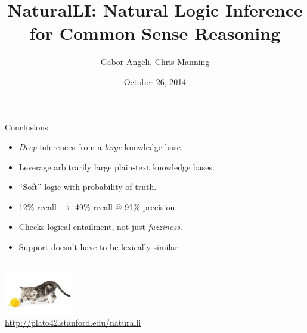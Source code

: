 \documentclass[hyperref]{beamer}
\title{NaturalLI: Natural Logic Inference for Common Sense Reasoning}
\subtitle{}
\author{Gabor Angeli, Chris Manning}
\date{October 26, 2014}
\institute[Stanford]{Stanford University}
\begin{document}
\begin{frame}[noframenumbering]
  \titlepage
\end{frame}




%



\begin{frame}{Conclusions}
\begin{itemize}
  \item \textit{Deep} inferences from a \textit{large} knowledge base.
  \item Leverage arbitrarily large plain-text knowledge bases.
  \item ``Soft'' logic with probability of truth.
\end{itemize}
\vspace{0.5cm}
\pause

\begin{itemize}
  \item 12\% recall $\rightarrow$ 49\% recall @ 91\% precision.
\end{itemize}
\vspace{0.25cm}
\pause

\begin{itemize}
  \item Checks logical entailment, not just \textit{fuzziness}.
  \item Support doesn't have to be lexically similar.
\end{itemize}
\end{frame}

\begin{frame}[noframenumbering]{}
\begin{center}
   \\
  \vspace{1cm}
  \includegraphics[width=3cm]{../../img/yarn-cat.jpg} \\
  \vspace{1cm}
  \url{http://plato42.stanford.edu/naturalli}
\end{center}
\end{frame}
\end{document}
